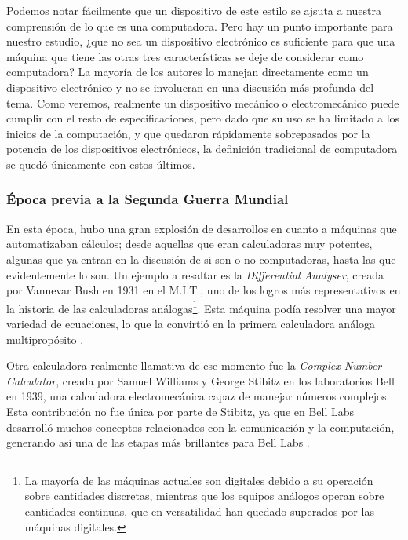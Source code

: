 \documentclass[letterpaper,12pt,oneside]{book}
\begin{document}
		Podemos notar fácilmente que un dispositivo de este estilo se ajsuta a nuestra comprensión de lo que es una computadora. Pero hay un punto 
		importante para nuestro 
		estudio, ¿que no sea un dispositivo electrónico es
		suficiente para que una máquina que tiene las otras tres características se deje de considerar como computadora? La mayoría de los autores lo manejan directamente
		como un dispositivo electrónico y no se involucran en una discusión más profunda del tema. Como veremos, realmente un dispositivo mecánico o electromecánico
		puede cumplir con el resto de especificaciones, pero dado que su uso se ha limitado a los inicios de la computación, y que quedaron rápidamente sobrepasados por la potencia de los dispositivos electrónicos, la definición tradicional de computadora se quedó únicamente con estos últimos.
		
        \subsubsection{Época previa a la Segunda Guerra Mundial}
		
		En esta época, hubo una gran explosión de desarrollos en cuanto a máquinas que automatizaban cálculos; desde
		aquellas que eran calculadoras muy potentes, algunas que ya entran en la discusión de si son o no computadoras, hasta las que evidentemente lo son. Un ejemplo a 
		resaltar es la \textit{Differential Analyser}, creada por Vannevar Bush en 1931 en el M.I.T., uno de los logros más representativos en la historia de las calculadoras
		análogas\footnote{La mayoría de las máquinas actuales son digitales debido a su operación sobre cantidades discretas, mientras que los equipos análogos operan
		sobre cantidades continuas, que en versatilidad han quedado superados por las máquinas digitales.}. Esta máquina podía resolver una mayor 
		variedad de ecuaciones, lo que la convirtió en la primera calculadora análoga multipropósito \cite[p.158]{ifrah_universal_2001}.
  
		Otra calculadora realmente llamativa de ese momento fue la \textit{Complex Number Calculator}, creada por		
		Samuel Williams y George Stibitz en los laboratorios Bell en 1939, una calculadora electromecánica capaz
		de manejar números complejos. Esta contribución no fue única por parte de Stibitz, ya que en Bell Labs desarrolló muchos conceptos relacionados con la
		comunicación y la computación, generando así una de las etapas más brillantes para Bell Labs \cite[p.207]{ifrah_universal_2001}.
		
\end{document}
